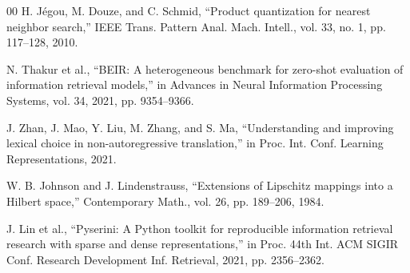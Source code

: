 \documentclass[conference]{IEEEtran}
\begin{document}
\begin{thebibliography}{00}
 H. Jégou, M. Douze, and C. Schmid, ``Product quantization for nearest neighbor search,'' IEEE Trans. Pattern Anal. Mach. Intell., vol. 33, no. 1, pp. 117--128, 2010.

 N. Thakur et al., ``BEIR: A heterogeneous benchmark for zero-shot evaluation of information retrieval models,'' in Advances in Neural Information Processing Systems, vol. 34, 2021, pp. 9354--9366.

 J. Zhan, J. Mao, Y. Liu, M. Zhang, and S. Ma, ``Understanding and improving lexical choice in non-autoregressive translation,'' in Proc. Int. Conf. Learning Representations, 2021.

 W. B. Johnson and J. Lindenstrauss, ``Extensions of Lipschitz mappings into a Hilbert space,'' Contemporary Math., vol. 26, pp. 189--206, 1984.

 J. Lin et al., ``Pyserini: A Python toolkit for reproducible information retrieval research with sparse and dense representations,'' in Proc. 44th Int. ACM SIGIR Conf. Research Development Inf. Retrieval, 2021, pp. 2356--2362.

\end{thebibliography}
\end{document}
